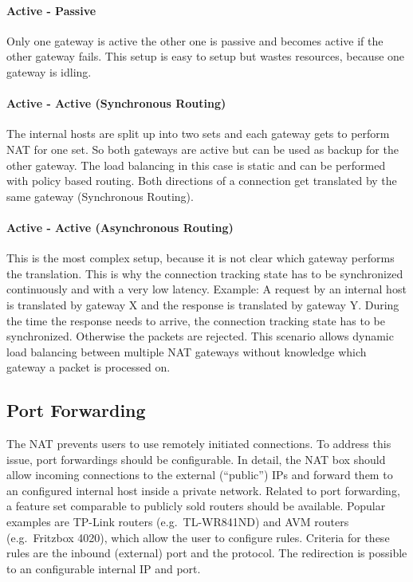 \documentclass{report}
\begin{document}
\paragraph{Active - Passive}

Only one gateway is active the other one is passive and becomes active
if the other gateway fails. This setup is easy to setup but wastes
resources, because one gateway is idling.

\paragraph{Active - Active (Synchronous Routing)}

The internal hosts are split up into two sets and each gateway gets to
perform NAT for one set. So both gateways are active but can be used as
backup for the other gateway. The load balancing in this case is static
and can be performed with policy based routing. Both directions of a
connection get translated by the same gateway (Synchronous Routing).

\paragraph{Active - Active (Asynchronous Routing)}

This is the most complex setup, because it is not clear which gateway
performs the translation. This is why the connection tracking state has
to be synchronized continuously and with a very low latency.
Example: A request by an internal host is translated by gateway X and the response
is translated by gateway Y. During the time the response needs to
arrive, the connection tracking state has to be synchronized. Otherwise
the packets are rejected. This scenario allows dynamic load balancing
between multiple NAT gateways without knowledge which gateway a packet is processed on.


\subsection{Port Forwarding}\label{port-forwarding}

The NAT prevents users to use remotely initiated connections. To address
this issue, port forwardings should be configurable. In detail, the NAT
box should allow incoming connections to the external (``public'') IPs
and forward them to an configured internal host inside a private
network. Related to port forwarding, a feature set comparable to
publicly sold routers should be available. Popular examples are TP-Link
routers (e.g.~TL-WR841ND\cite{TL-WR}) and AVM routers (e.g.~Fritzbox 4020\cite{fritzbox}), which
allow the user to configure rules. Criteria for these rules are the
inbound (external) port and the protocol. The redirection is possible to
an configurable internal IP and port.
\end{document}
